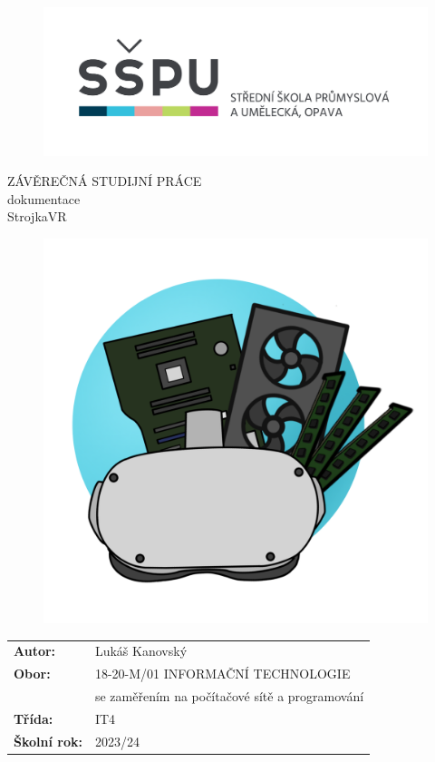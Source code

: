 \documentclass[12pt, a4paper,
twoside,        %
openright
]{report}
\title{\nazevPrace} %
\author{\jmenoAutora} %
\date{\datumOdevzdani} %
\newcommand\obor{INFORMAČNÍ TECHNOLOGIE} %
\newcommand\kodOboru{18-20-M/01} %
\newcommand\zamereni{se zaměřením na počítačové sítě a programování} %
\newcommand\trida{IT4} %
\newcommand\jmenoAutora{Lukáš Kanovský}  %
\newcommand\skolniRok{2023/24} %
\newcommand\nazevPrace{StrojkaVR} %
\begin{document}
	
	\pagestyle{empty}
	
	\cleardoublepage

	
	{\selectfont
		\begin{figure}[h]
			\centering
			\includegraphics[width=0.6\linewidth]{image/logo-skoly.png} 
		\end{figure}
		
		
		{\bfseries %
			\begin{center}
				\vspace{0.025 \textheight}
				\LARGE{ZÁVĚREČNÁ STUDIJNÍ PRÁCE}\\
				\large{dokumentace}\\
				\vspace{0.075 \textheight}
				\LARGE {\nazevPrace}\\
			\end{center}  
		}%
		
		\begin{figure}[h]
			\centering
			\includegraphics[width=0.5\linewidth]{image/logo.png} 
		\end{figure}
		
		\vspace{0.02 \textheight}
		\begin{table}[h!]
			\begin{tabular}{ll}
				\textbf{Autor:} & \jmenoAutora\\ 
				\textbf{Obor:} & \kodOboru { } \obor\\
				\textbf{} & \zamereni\\
				\textbf{Třída:} & \trida\\
				\textbf{Školní rok:} & \skolniRok\\
			\end{tabular}
			
		\end{table}		
	}
	
\end{document}
